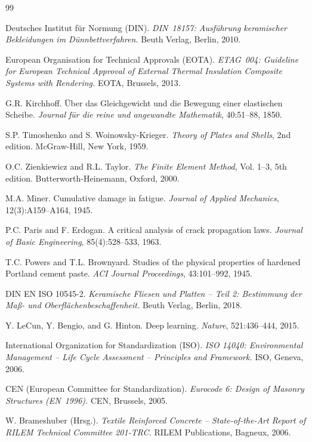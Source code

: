 ﻿\documentclass[a4paper,12pt]{article}
\theoremstyle{definition}
\begin{document}
\begin{thebibliography}{99}

Deutsches Institut für Normung (DIN).
\textit{DIN~18157: Ausführung keramischer Bekleidungen im Dünnbettverfahren.}
Beuth Verlag, Berlin, 2010.

European Organisation for Technical Approvals (EOTA).
\textit{ETAG~004: Guideline for European Technical Approval of External
Thermal Insulation Composite Systems with Rendering.}
EOTA, Brussels, 2013.

G.R. Kirchhoff.
Über das Gleichgewicht und die Bewegung einer elastischen Scheibe.
\textit{Journal für die reine und angewandte Mathematik}, 40:51--88, 1850.

S.P. Timoshenko and S. Woinowsky-Krieger.
\textit{Theory of Plates and Shells}, 2nd edition.
McGraw-Hill, New York, 1959.

O.C. Zienkiewicz and R.L. Taylor.
\textit{The Finite Element Method}, Vol. 1--3, 5th edition.
Butterworth-Heinemann, Oxford, 2000.

M.A. Miner.
Cumulative damage in fatigue.
\textit{Journal of Applied Mechanics}, 12(3):A159--A164, 1945.

P.C. Paris and F. Erdogan.
A critical analysis of crack propagation laws.
\textit{Journal of Basic Engineering}, 85(4):528--533, 1963.

T.C. Powers and T.L. Brownyard.
Studies of the physical properties of hardened Portland cement paste.
\textit{ACI Journal Proceedings}, 43:101--992, 1945.

DIN EN ISO 10545-2.
\textit{Keramische Fliesen und Platten -- Teil 2: Bestimmung der
Maß- und Oberflächenbeschaffenheit.}
Beuth Verlag, Berlin, 2018.

Y. LeCun, Y. Bengio, and G. Hinton.
Deep learning.
\textit{Nature}, 521:436--444, 2015.

International Organization for Standardization (ISO).
\textit{ISO 14040: Environmental Management -- Life Cycle Assessment --
Principles and Framework.}
ISO, Geneva, 2006.

CEN (European Committee for Standardization).
\textit{Eurocode 6: Design of Masonry Structures (EN~1996).}
CEN, Brussels, 2005.

W. Brameshuber (Hrsg.).
\textit{Textile Reinforced Concrete -- State-of-the-Art Report of RILEM
Technical Committee 201-TRC.}
RILEM Publications, Bagneux, 2006.

\end{thebibliography}
\end{document}
